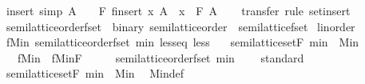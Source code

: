 \begin{isabellebody}
\endisatagproof
{\isafoldproof}%
%
\isadelimproof
\isanewline
%
\endisadelimproof
\isanewline
{}\isamarkupfalse%
\ insert\ {\isacharbrackleft}simp{\isacharbrackright}{\isacharcolon}\ {\isachardoublequoteopen}A\ {\isasymnoteq}\ {\isacharbraceleft}{\isacharbar}{\isacharbar}{\isacharbraceright}\ {\isasymLongrightarrow}\ F\ {\isacharparenleft}finsert\ x\ A{\isacharparenright}\ {\isacharequal}\ x\ \isactrlbold {\isacharasterisk}\ F\ A{\isachardoublequoteclose}\isanewline
%
\isadelimproof
\ \ %
\endisadelimproof
%
\isatagproof
{}\isamarkupfalse%
\ transfer\ {\isacharparenleft}rule\ set{\isachardot}insert{\isacharparenright}%
\endisatagproof
{\isafoldproof}%
%
\isadelimproof
\isanewline
%
\endisadelimproof
\isanewline
{}\isamarkupfalse%
\isanewline
\isanewline
{}\isamarkupfalse%
\ semilattice{\isacharunderscore}order{\isacharunderscore}fset\ {\isacharequal}\ binary{\isacharquery}{\isacharcolon}\ semilattice{\isacharunderscore}order\ {\isacharplus}\ semilattice{\isacharunderscore}fset\isanewline
{}\isanewline
\isanewline
{}\isamarkupfalse%
\isanewline
\isanewline
\isanewline
{}\isamarkupfalse%
\ linorder\ \isanewline
\isanewline
{}\isamarkupfalse%
\ fMin{\isacharcolon}\ semilattice{\isacharunderscore}order{\isacharunderscore}fset\ min\ less{\isacharunderscore}eq\ less\isanewline
\ \ \ {\isachardoublequoteopen}semilattice{\isacharunderscore}set{\isachardot}F\ min\ {\isacharequal}\ Min{\isachardoublequoteclose}\isanewline
\ \ \ fMin\ {\isacharequal}\ fMin{\isachardot}F\isanewline
%
\isadelimproof
%
\endisadelimproof
%
\isatagproof
{}\isamarkupfalse%
\ {\isacharminus}\isanewline
\ \ \isamarkupfalse%
\ {\isachardoublequoteopen}semilattice{\isacharunderscore}order{\isacharunderscore}fset\ min\ {\isacharparenleft}{\isasymle}{\isacharparenright}\ {\isacharparenleft}{\isacharless}{\isacharparenright}{\isachardoublequoteclose}\ \isamarkupfalse%
\ standard\isanewline
\isanewline
\ \ \isamarkupfalse%
\ {\isachardoublequoteopen}semilattice{\isacharunderscore}set{\isachardot}F\ min\ {\isacharequal}\ Min{\isachardoublequoteclose}\ \isamarkupfalse%
\ Min{\isacharunderscore}def\ \isacommand{{\isachardot}{\isachardot}}\isamarkupfalse%
\isanewline
{}\isamarkupfalse%
%
\endisatagproof
{\isafoldproof}%
%
\isadelimproof
\isanewline
%
\endisadelimproof
\isanewline
{}\isamarkupfalse%

\end{isabellebody}
